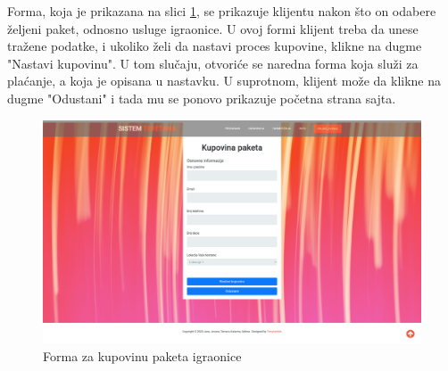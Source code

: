 \documentclass[../main.tex]{subfiles}
\begin{document}
Forma, koja je prikazana na slici \ref{fig:igraonice}, se prikazuje klijentu nakon što on odabere željeni paket, odnosno usluge igraonice. U ovoj formi klijent treba da unese tražene podatke, i ukoliko želi da nastavi proces kupovine, klikne na dugme "Nastavi kupovinu". U tom slučaju, otvoriće se naredna forma koja služi za plaćanje, a koja je opisana u nastavku. U suprotnom, klijent može da klikne na dugme "Odustani" i tada mu se ponovo prikazuje početna strana sajta.

\begin{figure}[!ht]
\begin{center}
\includegraphics[scale=0.22]{sections/korisnicki_interfejs/screenshots/odabir_paketa_za_igraonicu.png}
\end{center}

\caption{Forma za kupovinu paketa igraonice}
\label{fig:igraonice}
\end{figure}
\end{document}
